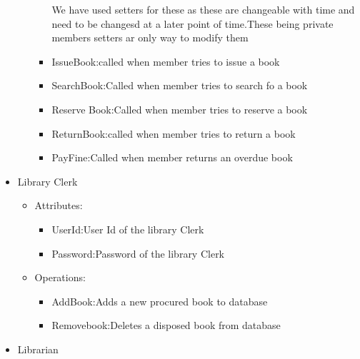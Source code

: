 \documentclass{article}
\begin{document}
\begin{itemize}
\begin{itemize}
\begin{itemize}
We have used setters for these as these are changeable with time and need to be changesd at a later point of time.These being private members setters ar only way to modify them
\\
\item IssueBook:called when member tries to issue a book\\
\item SearchBook:Called when member tries to search fo a book\\
\item Reserve Book:Called when member tries to reserve a book\\
\item ReturnBook:called when member tries to return a book\\
\item PayFine:Called when member returns an overdue book\\

\end{itemize}
\end{itemize}

\item Library Clerk
\begin{itemize}
\item Attributes:
\begin{itemize}
\item UserId:User Id of the library Clerk\\
\item Password:Password of the library Clerk\\
\end{itemize}

\item Operations:
\begin{itemize}
\item AddBook:Adds a new procured book to database\\
\item Removebook:Deletes a disposed book from database\\
\end{itemize}
\end{itemize}
\item Librarian

\begin{itemize}


\end{itemize}
\end{itemize}
\end{document}
